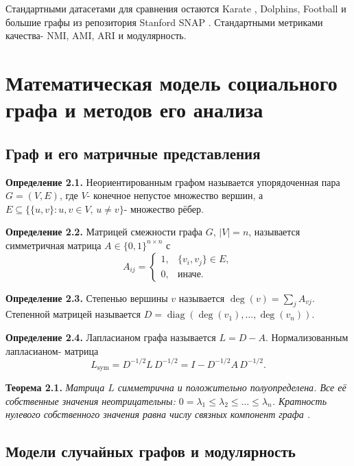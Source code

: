 \documentclass[14pt,a4paper]{extarticle}
\newcommand{\definition}[2]{\par\noindent\textbf{Определение #1.} #2\par}
\newcommand{\theorem}[2]{\par\noindent\textbf{Теорема #1.} \emph{#2}\par}
\begin{document}
Стандартными датасетами для сравнения остаются Karate \cite{zachary1977}, Dolphins, Football \cite{girvan2002} и большие графы из репозитория Stanford SNAP \cite{snap}. Стандартными метриками качества- NMI, AMI, ARI и модулярность.

\section{Математическая модель социального графа и методов его анализа}

\subsection{Граф и его матричные представления}

\definition{2.1}{Неориентированным графом называется упорядоченная пара $G = (V, E)$, где $V$- конечное непустое множество вершин, а $E \subseteq \{\{u, v\} : u, v \in V,\, u \neq v\}$- множество рёбер.}

\definition{2.2}{Матрицей смежности графа $G$, $|V| = n$, называется симметричная матрица $A \in \{0, 1\}^{n \times n}$ с
\begin{equation}
A_{ij} =
\begin{cases}
1, & \{v_i, v_j\} \in E,\\
0, & \text{иначе.}
\end{cases}
\end{equation}}

\definition{2.3}{Степенью вершины $v$ называется $\deg(v) = \sum_j A_{vj}$. Степенной матрицей называется $D = \operatorname{diag}(\deg(v_1), \dots, \deg(v_n))$.}

\definition{2.4}{Лапласианом графа называется $L = D - A$. Нормализованным лапласианом- матрица
\begin{equation}
L_{\mathrm{sym}} = D^{-1/2} L\, D^{-1/2} = I - D^{-1/2} A\, D^{-1/2}.
\end{equation}}

\theorem{2.1}{Матрица $L$ симметрична и положительно полуопределена. Все её собственные значения неотрицательны: $0 = \lambda_1 \leq \lambda_2 \leq \dots \leq \lambda_n$. Кратность нулевого собственного значения равна числу связных компонент графа \cite{newman2010}.}

\subsection{Модели случайных графов и модулярность}
\end{document}
